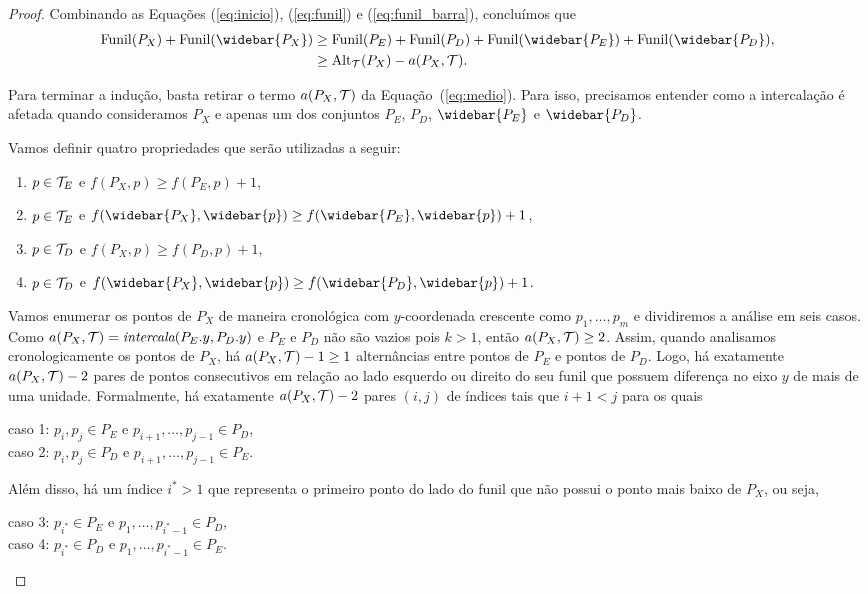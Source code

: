 \begin{proof}
    Combinando as Equações (\ref{eq:inicio}), (\ref{eq:funil}) e (\ref{eq:funil_barra}), concluímos que
    \begin{align}
        \Funil(P_X) + \Funil(\widebar{P_X}) &\geq \Funil(P_E) + \Funil(P_D) + \Funil(\widebar{P_E}) + \Funil(\widebar{P_D}), \notag \\
        &\geq \Alt_{\cT}(P_X) - a(P_X,\cT).
        \label{eq:medio}
    \end{align}

    Para terminar a indução, basta retirar o termo $a(P_X,\mathcal{T})$ da Equação~(\ref{eq:medio}). Para isso, precisamos entender como a intercalação é afetada quando consideramos $P_X$ e apenas um dos conjuntos $P_E$, $P_D$, $\widebar{P_E}$ e $\widebar{P_D}$.

    Vamos definir quatro propriedades que serão utilizadas a seguir:
    \begin{enumerate}[label=(\alph*)]  %
        \item $p \in \mathcal{T}_E$ e $f(P_X,p) \geq f(P_E,p) + 1$,
        \item $p \in \mathcal{T}_E$ e $f(\widebar{P_X},\widebar{p}) \geq f(\widebar{P_E},\widebar{p}) + 1$,
        \item $p \in \mathcal{T}_D$ e $f(P_X,p) \geq f(P_D,p) + 1$,
        \item $p \in \mathcal{T}_D$ e $f(\widebar{P_X},\widebar{p}) \geq f(\widebar{P_D},\widebar{p}) + 1$.
    \end{enumerate}

    Vamos enumerar os pontos de $P_X$ de maneira cronológica com $y$-coordenada crescente como $p_1,\ldots,p_m$ e dividiremos a análise em seis casos.
    Como $a(P_X,\mathcal{T}) = \emph{intercala}(P_E.y,P_D.y)$ e $P_E$ e $P_D$ não são vazios pois $k > 1$, então $a(P_X,\mathcal{T}) \geq 2$. Assim, quando analisamos cronologicamente os pontos de $P_X$, há $a(P_X,\mathcal{T}) - 1 \geq 1$ alternâncias entre pontos de $P_E$ e pontos de $P_D$. Logo, há exatamente $a(P_X,\mathcal{T}) - 2$ pares de pontos consecutivos em relação ao lado esquerdo ou direito do seu funil que possuem diferença no eixo $y$ de mais de uma unidade. Formalmente, há exatamente $a(P_X,\mathcal{T}) - 2$ pares $(i,j)$ de índices tais que $i + 1 < j$ para os quais 
    \begin{center}
        caso 1: $p_i,p_j \in P_E$ e $p_{i+1},\ldots,p_{j-1} \in P_D$,\\
        caso 2: $p_i,p_j \in P_D$ e $p_{i+1},\ldots,p_{j-1} \in P_E$.
    \end{center}

    Além disso, há um índice $i^{*} > 1$ que representa o primeiro ponto do lado do funil que não possui o ponto mais baixo de $P_X$, ou seja,
    \begin{center}
        caso 3: $p_{i^{*}} \in P_E$ e $p_1,\ldots,p_{i^{*}-1} \in P_D$,\\
        caso 4: $p_{i^{*}}  \in P_D$ e $p_1,\ldots,p_{i^{*}-1} \in P_E$.
    \end{center}


\end{proof}
